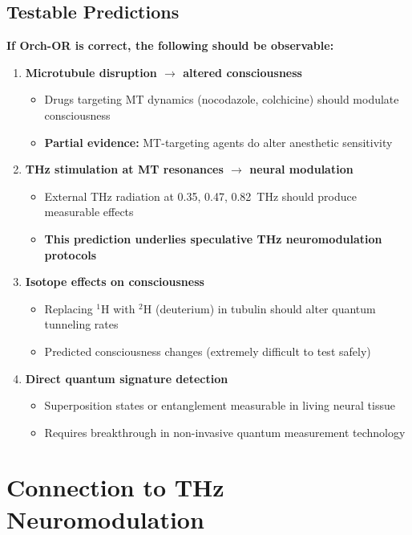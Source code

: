 \subsection{Testable Predictions}

\textbf{If Orch-OR is correct, the following should be observable:}

\begin{enumerate}
\item \textbf{Microtubule disruption $\rightarrow$ altered consciousness}
  \begin{itemize}
  \item Drugs targeting MT dynamics (nocodazole, colchicine) should modulate consciousness
  \item \textbf{Partial evidence:} MT-targeting agents do alter anesthetic sensitivity
  \end{itemize}

\item \textbf{THz stimulation at MT resonances $\rightarrow$ neural modulation}
  \begin{itemize}
  \item External THz radiation at 0.35, 0.47, 0.82~THz should produce measurable effects
  \item \textbf{This prediction underlies speculative THz neuromodulation protocols}
  \end{itemize}

\item \textbf{Isotope effects on consciousness}
  \begin{itemize}
  \item Replacing $^1$H with $^2$H (deuterium) in tubulin should alter quantum tunneling rates
  \item Predicted consciousness changes (extremely difficult to test safely)
  \end{itemize}

\item \textbf{Direct quantum signature detection}
  \begin{itemize}
  \item Superposition states or entanglement measurable in living neural tissue
  \item Requires breakthrough in non-invasive quantum measurement technology
  \end{itemize}
\end{enumerate}

\section{Connection to THz Neuromodulation}

